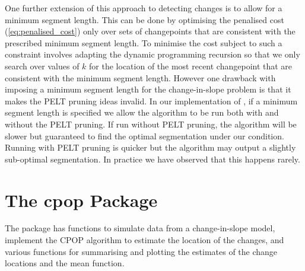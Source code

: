 \documentclass[nojss]{jss}
\begin{document}
One further extension of this approach to detecting changes is to allow for a minimum segment length. This can be done by optimising the penalised cost (\ref{eq:penalised_cost}) only over sets of changepoints that are consistent with the prescribed minimum segment length. To minimise the cost subject to such a constraint involves adapting the dynamic programming recursion so that we only search over values of $k$ for the location of the most recent changepoint that are consistent with the minimum segment length. However one drawback with imposing a minimum segment length for the change-in-slope problem is that it makes the PELT pruning ideas invalid. In our implementation of , if a minimum segment length is specified we allow the algorithm to be run both with and without the PELT pruning. If run without PELT pruning, the algorithm will be slower but guaranteed to find the optimal segmentation under our condition. Running with PELT pruning is quicker but the algorithm may output a slightly sub-optimal segmentation. In practice we have observed that this happens rarely. %


\section{The {cpop} Package} \label{sec:cpop}

The  package has functions to simulate data from a change-in-slope model, implement the CPOP algorithm to estimate the location of the changes, and various functions for summarising and plotting the estimates of the change locations and the mean function. 
\end{document}
